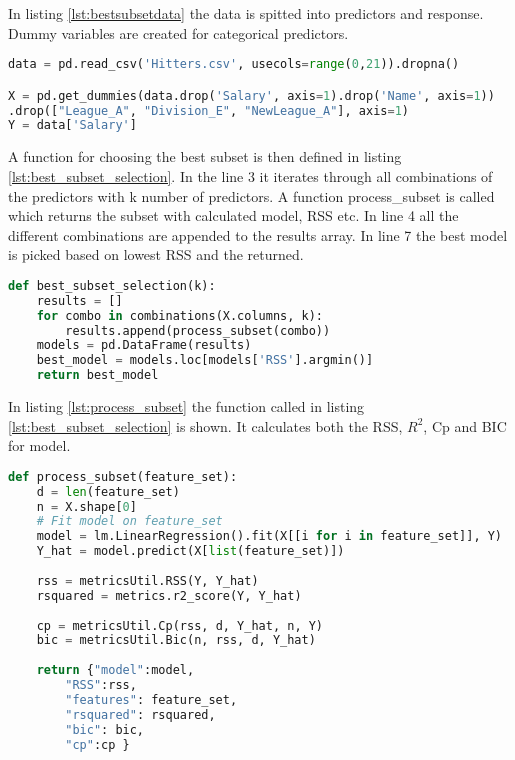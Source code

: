 In listing \ref{lst:bestsubsetdata} the data is spitted into predictors and response. Dummy variables are created for categorical predictors.

\begin{lstlisting}[language=Python, label=lst:bestsubsetdata, caption=Data is splitet into predictors and response]
data = pd.read_csv('Hitters.csv', usecols=range(0,21)).dropna()

X = pd.get_dummies(data.drop('Salary', axis=1).drop('Name', axis=1))
.drop(["League_A", "Division_E", "NewLeague_A"], axis=1)
Y = data['Salary']
\end{lstlisting}


A function for choosing the best subset is then defined in listing \ref{lst:best_subset_selection}. In the line 3 it iterates through all combinations of the predictors with k number of predictors. A function process\_subset is called which returns the subset with calculated model, RSS etc. In line 4 all the different combinations are appended to the results array. In line 7 the best model is picked based on lowest RSS and the returned.

\begin{lstlisting}[language=Python, label=lst:best_subset_selection, caption=function for choosing best subset]
def best_subset_selection(k):
	results = []
	for combo in combinations(X.columns, k):
		results.append(process_subset(combo))
	models = pd.DataFrame(results)
	best_model = models.loc[models['RSS'].argmin()]
	return best_model
\end{lstlisting}

In listing \ref{lst:process_subset} the function called in listing \ref{lst:best_subset_selection} is shown. It calculates both the RSS, $R^2$, Cp and BIC for model.

\begin{lstlisting}[language=Python, label=lst:process_subset, caption=Calculating metrics for subset]
def process_subset(feature_set):
	d = len(feature_set)
	n = X.shape[0]
	# Fit model on feature_set  
	model = lm.LinearRegression().fit(X[[i for i in feature_set]], Y)
	Y_hat = model.predict(X[list(feature_set)])
	
	rss = metricsUtil.RSS(Y, Y_hat)  
	rsquared = metrics.r2_score(Y, Y_hat)
	
	cp = metricsUtil.Cp(rss, d, Y_hat, n, Y)
	bic = metricsUtil.Bic(n, rss, d, Y_hat)
	
	return {"model":model, 
		"RSS":rss,
		"features": feature_set,
		"rsquared": rsquared,
		"bic": bic,
		"cp":cp }
\end{lstlisting}

